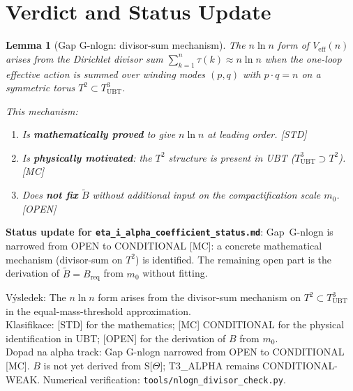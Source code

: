 \documentclass[12pt,a4paper]{article}
\newtheorem{lemma}[theorem]{Lemma}
\theoremstyle{remark}
\begin{document}
\section{Verdict and Status Update}
\label{sec:verdict}

\begin{lemma}[Gap G-nlogn: divisor-sum mechanism]
\label{lem:nlogn}
The $n\ln n$ form of $V_{\mathrm{eff}}(n)$ arises from the Dirichlet divisor sum
$\sum_{k=1}^n\tau(k) \approx n\ln n$ when the one-loop effective action is
summed over winding modes $(p,q)$ with $p\cdot q = n$ on a symmetric torus
$T^2\subset T^3_{\mathrm{UBT}}$.

This mechanism:
\begin{enumerate}
  \item Is \textbf{mathematically proved} to give $n\ln n$ at leading order. [STD]
  \item Is \textbf{physically motivated}: the $T^2$ structure is present in
        UBT ($T^3_{\mathrm{UBT}} \supset T^2$). [MC]
  \item Does \textbf{not fix} $\tilde B$ without additional input on the
        compactification scale $m_0$. [OPEN]
\end{enumerate}
\end{lemma}

\textbf{Status update for \texttt{eta\_i\_alpha\_coefficient\_status.md}}:
Gap~G-nlogn is narrowed from OPEN to CONDITIONAL [MC]:
a concrete mathematical mechanism (divisor-sum on $T^2$) is identified.
The remaining open part is the derivation of $\tilde B = B_{\mathrm{req}}$
from $m_0$ without fitting.

\begin{statusbox}
Výsledek: The $n\ln n$ form arises from the divisor-sum mechanism on
$T^2\subset T^3_{\mathrm{UBT}}$ in the equal-mass-threshold approximation.\\
Klasifikace: [STD] for the mathematics; [MC] CONDITIONAL for the physical
  identification in UBT; [OPEN] for the derivation of $B$ from $m_0$.\\
Dopad na alpha track: Gap G-nlogn narrowed from OPEN to CONDITIONAL [MC].
$B$ is not yet derived from S[$\Theta$]; T3\_ALPHA remains CONDITIONAL-WEAK.
Numerical verification: \texttt{tools/nlogn\_divisor\_check.py}.
\end{statusbox}

\ifdefined\INCLUDEMODE
\else
  
\end{document}
